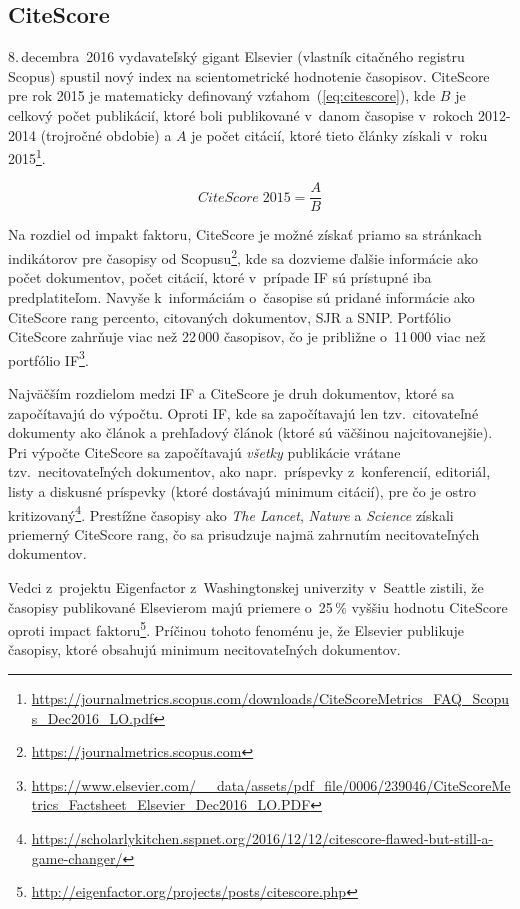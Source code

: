 \subsection{CiteScore}
\label{sec:citescore}

8.\,decembra~2016 vydavateľský gigant Elsevier (vlastník citačného registru
Scopus) spustil nový index na scientometrické hodnotenie časopisov.  CiteScore
pre rok 2015 je matematicky definovaný vzťahom~(\ref{eq:citescore}), kde $B$ je
celkový počet publikácií, ktoré boli publikované v~danom časopise v~rokoch
2012-2014 (trojročné obdobie) a $A$ je počet citácií, ktoré tieto články získali
v~roku
2015\footnote{\url{https://journalmetrics.scopus.com/downloads/CiteScoreMetrics_FAQ_Scopus_Dec2016_LO.pdf}}.

\begin{equation}
\label{eq:citescore}
CiteScore\; 2015 = \frac{A}{B}
\end{equation}

Na rozdiel od impakt faktoru, CiteScore je možné získať priamo sa stránkach
indikátorov pre časopisy od
Scopusu\footnote{\url{https://journalmetrics.scopus.com}}, kde sa dozvieme
ďalšie informácie ako počet dokumentov, počet citácií, ktoré v~prípade IF sú
prístupné iba predplatiteľom.  Navyše k~informáciám o~časopise sú pridané
informácie ako CiteScore rang percento, citovaných dokumentov, SJR a SNIP.
Portfólio CiteScore zahrňuje viac než 22\,000 časopisov, čo je približne
o~11\,000 viac než portfólio
IF\footnote{\url{https://www.elsevier.com/__data/assets/pdf_file/0006/239046/CiteScoreMetrics_Factsheet_Elsevier_Dec2016_LO.PDF}}.

Najväčším rozdielom medzi IF a CiteScore je druh dokumentov, ktoré sa
započítavajú do výpočtu.  Oproti IF, kde sa započítavajú len tzv.~citovateľné
dokumenty ako článok a prehľadový článok (ktoré sú väčšinou najcitovanejšie).
Pri výpočte CiteScore sa započítavajú \emph{všetky} publikácie vrátane
tzv.~necitovateľných dokumentov, ako napr.~príspevky z~konferencií, editoriál,
listy a diskusné príspevky (ktoré dostávajú minimum citácií), pre čo je ostro
kritizovaný\footnote{\url{https://scholarlykitchen.sspnet.org/2016/12/12/citescore-flawed-but-still-a-game-changer/}}.
Prestížne časopisy ako \emph{The Lancet}, \emph{Nature} a \emph{Science} získali
priemerný CiteScore rang, čo sa prisudzuje najmä zahrnutím necitovateľných
dokumentov.

Vedci z~projektu Eigenfactor z~Washingtonskej univerzity v~Seattle zistili, že
časopisy publikované Elsevierom majú priemere o~25\,\% vyššiu hodnotu CiteScore
oproti impact
faktoru\footnote{\url{http://eigenfactor.org/projects/posts/citescore.php}}.
Príčinou tohoto fenoménu je, že Elsevier publikuje časopisy, ktoré obsahujú
minimum necitovateľných dokumentov.


